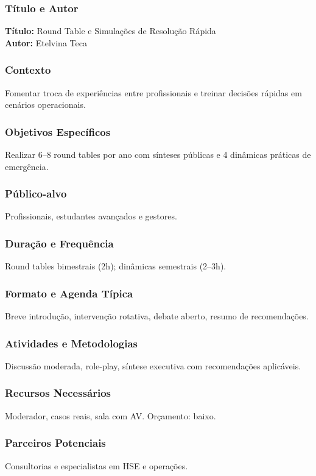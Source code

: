 \documentclass[12pt,a4paper]{article}
\begin{document}
\subsubsection*{Título e Autor}
\textbf{Título:} Round Table e Simulações de Resolução Rápida \\
\textbf{Autor:} Etelvina Teca

\subsubsection*{Contexto}
Fomentar troca de experiências entre profissionais e treinar decisões rápidas em cenários operacionais.

\subsubsection*{Objetivos Específicos}
Realizar 6–8 round tables por ano com sínteses públicas e 4 dinâmicas práticas de emergência.

\subsubsection*{Público-alvo}
Profissionais, estudantes avançados e gestores.

\subsubsection*{Duração e Frequência}
Round tables bimestrais (2h); dinâmicas semestrais (2–3h).

\subsubsection*{Formato e Agenda Típica}
Breve introdução, intervenção rotativa, debate aberto, resumo de recomendações.

\subsubsection*{Atividades e Metodologias}
Discussão moderada, role-play, síntese executiva com recomendações aplicáveis.

\subsubsection*{Recursos Necessários}
Moderador, casos reais, sala com AV. Orçamento: baixo.

\subsubsection*{Parceiros Potenciais}
Consultorias e especialistas em HSE e operações.
\end{document}
